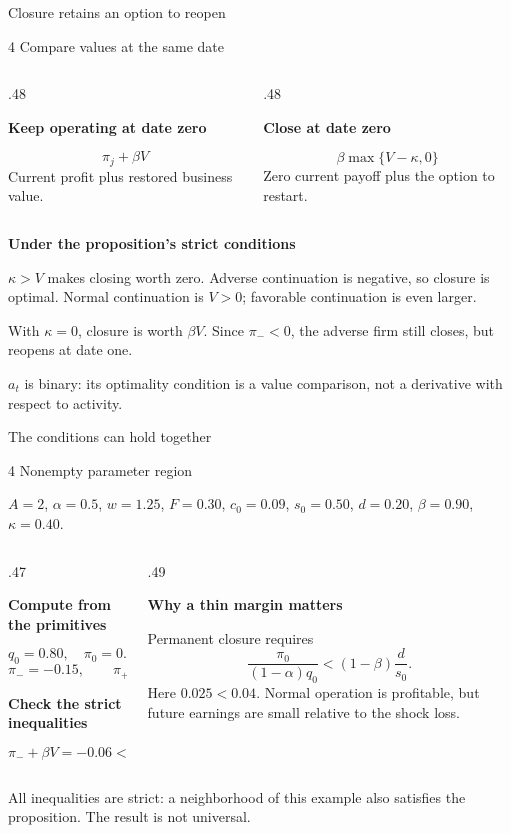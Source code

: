 \documentclass[aspectratio=169,11pt]{beamer}
\newcommand{\kwTurq}[1]{{\color{turquoise}#1}}
\newcommand{\labeltext}[1]{\par{\small\bfseries\color{blue}#1\par}\vspace{1.5mm}}
\newcommand{\takeaway}[1]{\par\vspace{2.5mm}\begingroup\setlength{\fboxsep}{2.5mm}\colorbox{pale}{\begin{minipage}{\dimexpr\linewidth-5mm\relax}\small\raggedright #1\end{minipage}}\endgroup\par}
\newcommand{\panel}[3]{\begingroup\setlength{\fboxsep}{2.5mm}\colorbox{#1}{\begin{minipage}[t]{\dimexpr#2-5mm\relax}\raggedright #3\end{minipage}}\endgroup}
\newcommand{\sectiontag}[1]{{\scriptsize\color{muted}#1\par}\vspace{2mm}}
\begin{document}
\begin{frame}{Closure retains an \kwTurq{option to reopen}}

\sectiontag{4 \textperiodcentered{} Compare values at the same date}
\begin{columns}[T,onlytextwidth]
\begin{column}{.48\textwidth}\panel{paleteal}{\linewidth}{\labeltext{Keep operating at date zero}\[\pi_j+\beta V\]\small Current profit plus restored business value.}\end{column}
\begin{column}{.48\textwidth}\panel{paleorange}{\linewidth}{\labeltext{Close at date zero}\[\beta\max\{V-\kappa,0\}\]\small Zero current payoff plus the option to restart.}\end{column}
\end{columns}
\vspace{5mm}
\labeltext{Under the proposition's strict conditions}
\small $\kappa>V$ makes closing worth zero. Adverse continuation is negative, so closure is optimal. Normal continuation is $V>0$; favorable continuation is even larger.\par\vspace{3mm}
With $\kappa=0$, closure is worth $\beta V$. Since $\pi_-<0$, the adverse firm still closes, but reopens at date one.
\takeaway{$a_t$ is binary: its optimality condition is a value comparison, not a derivative with respect to activity.}

\end{frame}

\begin{frame}{The conditions \kwTurq{can hold together}}

\sectiontag{4 \textperiodcentered{} Nonempty parameter region}
\small $A=2$, $\alpha=0.5$, $w=1.25$, $F=0.30$, $c_0=0.09$, $s_0=0.50$, $d=0.20$, $\beta=0.90$, $\kappa=0.40$.
\vspace{4mm}
\begin{columns}[T,onlytextwidth]
\begin{column}{.47\textwidth}\labeltext{Compute from the primitives}
\[q_0=0.80,\quad \pi_0=0.01,\quad V=0.10,\]
\[\pi_-=-0.15,\qquad \pi_+=0.17.\]
\labeltext{Check the strict inequalities}
\[\pi_-+\beta V=-0.06<0,\qquad \kappa>V.\]
\end{column}
\begin{column}{.49\textwidth}\labeltext{Why a thin margin matters}
\small Permanent closure requires
\[\frac{\pi_0}{(1-\alpha)q_0}<(1-\beta)\frac d{s_0}.\]
Here $0.025<0.04$. Normal operation is profitable, but future earnings are small relative to the shock loss.
\end{column}
\end{columns}
\takeaway{All inequalities are strict: a neighborhood of this example also satisfies the proposition. The result is not universal.}

\end{frame}
\end{document}

